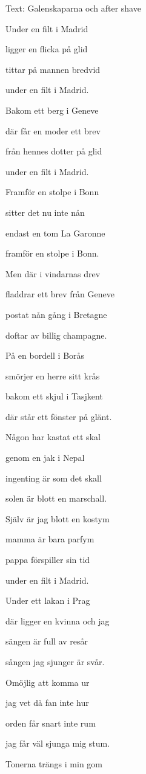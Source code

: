 Text: Galenskaparna och after shave 
\bigskip


Under en filt i Madrid

ligger en flicka på glid

tittar på mannen bredvid

under en filt i Madrid.\bigskip

Bakom ett berg i Geneve

där får en moder ett brev

från hennes dotter på glid

under en filt i Madrid. \bigskip

Framför en stolpe i Bonn

sitter det nu inte nån

endast en tom La Garonne

framför en stolpe i Bonn.\bigskip

Men där i vindarnas drev

fladdrar ett brev från Geneve

postat nån gång i Bretagne

doftar av billig champagne.\bigskip

På en bordell i Borås

smörjer en herre sitt krås

bakom ett skjul i Tasjkent

där står ett fönster på glänt.\bigskip

Någon har kastat ett skal

genom en jak i Nepal

ingenting är som det skall

solen är blott en marschall.\bigskip

Själv är jag blott en kostym

mamma är bara parfym

pappa förspiller sin tid

under en filt i Madrid.\bigskip

Under ett lakan i Prag

där ligger en kvinna och jag

sängen är full av resår

sången jag sjunger är svår.\bigskip

Omöjlig att komma ur

jag vet då fan inte hur

orden får snart inte rum

jag får väl sjunga mig stum.\bigskip

Tonerna trängs i min gom

